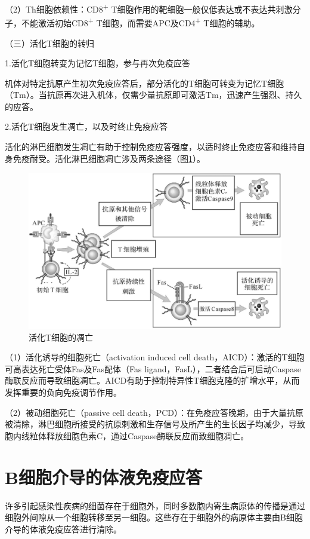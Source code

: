 （2）Th细胞依赖性：CD8\textsuperscript{+}
T细胞作用的靶细胞一般仅低表达或不表达共刺激分子，不能激活初始CD8\textsuperscript{+}
T细胞，而需要APC及CD4\textsuperscript{+} T细胞的辅助。

（三）活化T细胞的转归

1.活化T细胞转变为记忆T细胞，参与再次免疫应答

机体对特定抗原产生初次免疫应答后，部分活化的T细胞可转变为记忆T细胞（Tm）。当抗原再次进入机体，仅需少量抗原即可激活Tm，迅速产生强烈、持久的应答。

2.活化T细胞发生凋亡，以及时终止免疫应答

活化的淋巴细胞发生凋亡有助于控制免疫应答强度，以适时终止免疫应答和维持自身免疫耐受。活化淋巴细胞凋亡涉及两条途径（图\ref{fig9-14}）。

\begin{figure}[!htbp]
 \centering
 \includegraphics[width=.6\textwidth]{./images/Image00140.jpg}
 \captionsetup{justification=centering}
 \caption{活化T细胞的凋亡}
 \label{fig9-14}
  \end{figure} 

（1）活化诱导的细胞死亡（activation induced cell
death，AICD）：激活的T细胞可高表达死亡受体Fas及Fas配体（Fas
ligand，FasL），二者结合后可启动Caspase酶联反应而导致细胞凋亡。AICD有助于控制特异性T细胞克隆的扩增水平，从而发挥重要的负向免疫调节作用。

（2）被动细胞死亡（passive cell
death，PCD）：在免疫应答晚期，由于大量抗原被清除，淋巴细胞所接受的抗原刺激和生存信号及所产生的生长因子均减少，导致胞内线粒体释放细胞色素C，通过Caspase酶联反应而致细胞凋亡。

\section{B细胞介导的体液免疫应答}

许多引起感染性疾病的细菌存在于细胞外，同时多数胞内寄生病原体的传播是通过细胞外间隙从一个细胞转移至另一细胞。这些存在于细胞外的病原体主要由B细胞介导的体液免疫应答进行清除。

